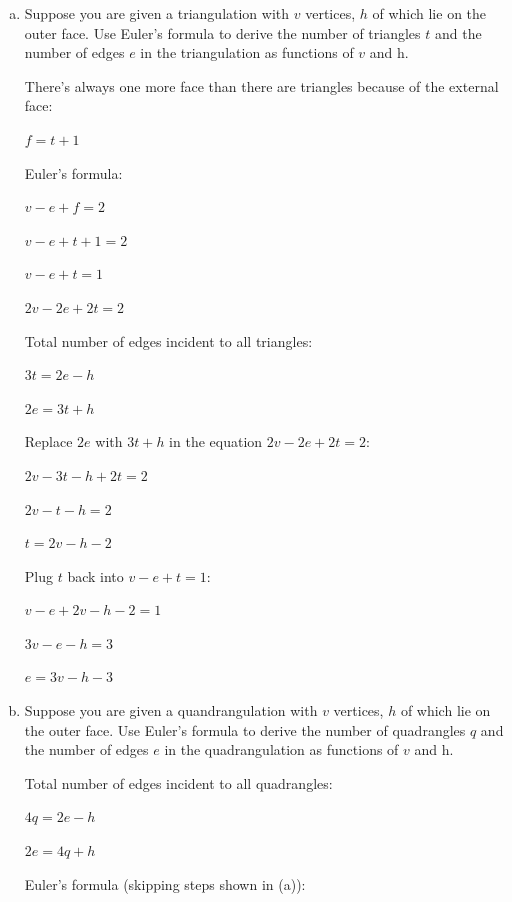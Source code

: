 \documentclass[11pt]{article}
\begin{document}
\begin{enumerate}[(a)]\itemsep0pt
  \item
    Suppose you are given a triangulation with \(v\) vertices, \(h\) of which lie on the outer face.
    Use Euler's formula to derive the number of triangles \(t\) and the number of edges \(e\) in
    the triangulation as functions of \(v\) and h.
    
\begin{solution}
  There's always one more face than there are triangles because of the external face:

  \(f = t + 1\)

  Euler's formula:

  \(v - e + f = 2\)

  \(v - e + t + 1 = 2\)

  \(v - e + t = 1\)

  \(2v - 2e + 2t = 2\)

  Total number of edges incident to all triangles:

  \(3t = 2e - h\)

  \(2e = 3t + h\)

  Replace \(2e\) with \(3t + h\) in the equation \(2v - 2e + 2t = 2\):

  \(2v - 3t - h + 2t = 2\)

  \(2v - t - h = 2\)

  \(t = 2v - h - 2\)

  Plug \(t\) back into \(v - e + t = 1\):

  \(v - e + 2v - h - 2 = 1\)

  \(3v - e - h = 3\)

  \(e = 3v - h - 3\)
\end{solution}

  \item
    Suppose you are given a quandrangulation with \(v\) vertices, \(h\) of which lie on the outer
    face. Use Euler’s formula to derive the number of quadrangles \(q\) and the number of
    edges \(e\) in the quadrangulation as functions of \(v\) and h.

\begin{solution}
  Total number of edges incident to all quadrangles:

  \(4q = 2e - h\)

  \(2e = 4q + h\)

  Euler's formula (skipping steps shown in (a)):


\end{solution}
\end{enumerate}
\end{document}
